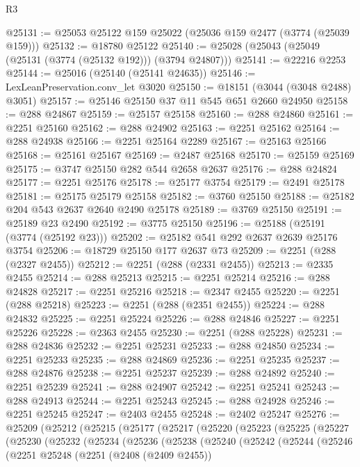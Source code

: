 \begin{lexlean}{R3}
\begin{coremodule}
@25131 := @25053 @25122 @159 @25022 (@25036 @159 @2477 (@3774 (@25039 @159)))
@25132 := @18780 @25122
@25140 := @25028 (@25043 (@25049 (@25131 (@3774 (@25132 @192))) (@3794 @24807)))
@25141 := @22216 @2253
@25144 := @25016 (@25140 (@25141 @24635))
@25146 := LexLeanPreservation.conv_let @3020
@25150 := @18151 (@3044 (@3048 @2488) @3051)
@25157 := @25146 @25150 @37 @11 @545 @651 @2660 @24950
@25158 := @288 @24867
@25159 := @25157 @25158
@25160 := @288 @24860
@25161 := @2251 @25160
@25162 := @288 @24902
@25163 := @2251 @25162
@25164 := @288 @24938
@25166 := @2251 @25164 @2289
@25167 := @25163 @25166
@25168 := @25161 @25167
@25169 := @2487 @25168
@25170 := @25159 @25169
@25175 := @3747 @25150 @282 @544 @2658 @2637
@25176 := @288 @24824
@25177 := @2251 @25176
@25178 := @25177 @3754
@25179 := @2491 @25178
@25181 := @25175 @25179 @25158
@25182 := @3760 @25150
@25188 := @25182 @204 @543 @2637 @2640 @2490 @25178
@25189 := @3769 @25150
@25191 := @25189 @23 @2490
@25192 := @3775 @25150
@25196 := @25188 (@25191 (@3774 (@25192 @23)))
@25202 := @25182 @541 @292 @2637 @2639 @25176 @3754
@25206 := @18729 @25150 @177 @2637 @73
@25209 := @2251 (@288 (@2327 @2455))
@25212 := @2251 (@288 (@2331 @2455))
@25213 := @2335 @2455
@25214 := @288 @25213
@25215 := @2251 @25214
@25216 := @288 @24828
@25217 := @2251 @25216
@25218 := @2347 @2455
@25220 := @2251 (@288 @25218)
@25223 := @2251 (@288 (@2351 @2455))
@25224 := @288 @24832
@25225 := @2251 @25224
@25226 := @288 @24846
@25227 := @2251 @25226
@25228 := @2363 @2455
@25230 := @2251 (@288 @25228)
@25231 := @288 @24836
@25232 := @2251 @25231
@25233 := @288 @24850
@25234 := @2251 @25233
@25235 := @288 @24869
@25236 := @2251 @25235
@25237 := @288 @24876
@25238 := @2251 @25237
@25239 := @288 @24892
@25240 := @2251 @25239
@25241 := @288 @24907
@25242 := @2251 @25241
@25243 := @288 @24913
@25244 := @2251 @25243
@25245 := @288 @24928
@25246 := @2251 @25245
@25247 := @2403 @2455
@25248 := @2402 @25247
@25276 := @25209
    (@25212
      (@25215
        (@25177
          (@25217
            (@25220
              (@25223
                (@25225
                  (@25227
                    (@25230
                      (@25232
                        (@25234
                          (@25236
                            (@25238
                              (@25240
                                (@25242
                                  (@25244
                                    (@25246
                                      (@2251
                                        @25248
                                        (@2251
                                          (@2408 (@2409 @2455))

\end{coremodule}
\end{lexlean}
